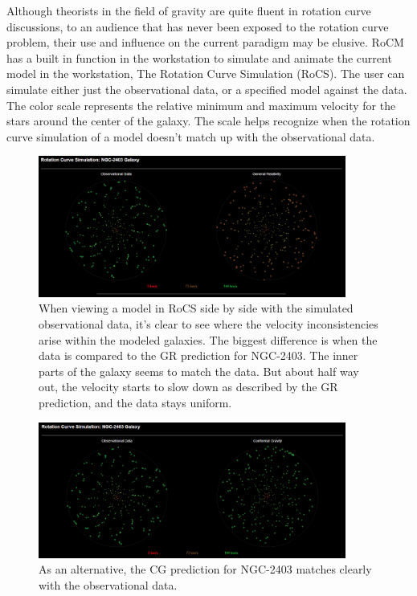\documentclass[conference]{IEEEtran-modified}
\begin{document}
Although theorists in the field of gravity are quite fluent in rotation curve discussions, to an audience that has never been exposed to the rotation curve problem, their use and influence on the current paradigm may be elusive. RoCM has a built in function in the workstation to simulate and animate the current model in the workstation, The Rotation Curve Simulation (RoCS). The user can simulate either just the observational data, or a specified model against the data. The color scale represents the relative {\color[HTML]{EA051C} minimum} and {\color[HTML]{1AAF3A} maximum} velocity for the stars around the center of the galaxy. The scale helps recognize when the rotation curve simulation of a model doesn't match up with the observational data.



\begin{figure}[h!]
\centering
\includegraphics[width=0.9\textwidth]{NGC-2403-GR}
\caption{When viewing a model in RoCS side by side with the simulated observational data, it's clear to see where the velocity inconsistencies arise within the modeled galaxies. The biggest difference is when the data is compared to the GR prediction for NGC-2403. The inner parts of the galaxy seems to match the data. But about half way out, the velocity starts to slow down as described by the GR prediction, and the data stays uniform.}
\label{ngc2403gr}
\end{figure}


\begin{figure}[h!]
\centering
\includegraphics[width=0.9\textwidth]{NGC-2403-CG}
\caption{As an alternative, the CG prediction for NGC-2403 matches clearly with the observational data.}
\label{ngc2403cg}
\end{figure}
\end{document}
